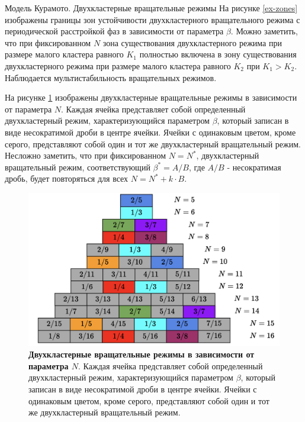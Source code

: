 \begin{chapter}{Модель Курамото. Двухкластерные вращательные режимы}
	На рисунке \ref{ex-zones} изображены границы зон устойчивости двухкластерного вращательного режима
	с периодической расстройкой фаз в зависимости от параметра $\beta$.
	Можно заметить, что при фиксированном $N$ зона существования двухкластерного режима при размере малого кластера равного $K_1$ полностью включена в 
	зону существования двухкластерного режима при размере малого кластера равного $K_2$ при $K_1 > K_2$. Наблюдается мультистабильность вращательных режимов.


	На рисунке \ref{schema} изображены двухкластерные вращательные режимы в зависимости от параметра $N$.
	Каждая ячейка представляет собой определенный двухкластерный режим,
	характеризующийся параметром $\beta$, который записан в виде несократимой дроби в центре ячейки. Ячейки с одинаковым цветом, кроме серого, представляют собой
	один и тот же двухкластерный вращательный режим. Несложно заметить, что при фиксированном $N = N^*$,
	двухкластерный вращательный режим, соответствующий $\beta^* = A/B$, где $A/B$ - несократимая дробь, 
	будет повторяться для всех $N = N^* + k\cdot B$. 

	\begin{figure}[h!]
		\begin{center}
			\includegraphics[width=1\columnwidth]{pictures/schema.png}
		\end{center}
		\caption{\textbf{Двухкластерные вращательные режимы в зависимости от параметра $N$}. Каждая ячейка представляет собой определенный двухкластерный режим,
		характеризующийся параметром $\beta$, который записан в виде несократимой дроби в центре ячейки. Ячейки с одинаковым цветом, кроме серого, представляют собой
		один и тот же двухкластерный вращательный режим.}
		\label{schema}
	\end{figure}

\end{chapter}